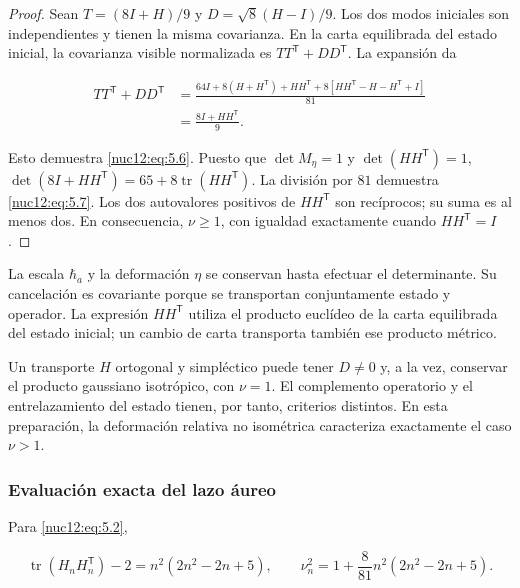 \begin{proof}
Sean \(T=(8I+H)/9\) y \(D=\sqrt8(H-I)/9\). Los dos modos iniciales son independientes y tienen la misma covarianza. En la carta equilibrada del estado inicial, la covarianza visible normalizada es \(TT^{\mathsf T}+DD^{\mathsf T}\). La expansión da



\[
\begin{aligned}
TT^{\mathsf T}+DD^{\mathsf T}
&=\frac{64I+8(H+H^{\mathsf T})+HH^{\mathsf T}
+8[HH^{\mathsf T}-H-H^{\mathsf T}+I]}{81}\\
&=\frac{8I+HH^{\mathsf T}}9.
\end{aligned}
\]



Esto demuestra \eqref{nuc12:eq:5.6}. Puesto que \(\det M_\eta=1\) y \(\det(HH^{\mathsf T})=1\),
\(\det(8I+HH^{\mathsf T})=65+8\operatorname{tr}(HH^{\mathsf T})\).
La división por \(81\) demuestra \eqref{nuc12:eq:5.7}. Los dos autovalores positivos de \(HH^{\mathsf T}\) son recíprocos; su suma es al menos dos. En consecuencia, \(\nu\geq1\), con igualdad exactamente cuando \(HH^{\mathsf T}=I\).
\end{proof}

La escala \(\hbar_a\) y la deformación \(\eta\) se conservan hasta efectuar el determinante. Su cancelación es covariante porque se transportan conjuntamente estado y operador. La expresión \(HH^{\mathsf T}\) utiliza el producto euclídeo de la carta equilibrada del estado inicial; un cambio de carta transporta también ese producto métrico.

Un transporte \(H\) ortogonal y simpléctico puede tener \(D\neq0\) y, a la vez, conservar el producto gaussiano isotrópico, con \(\nu=1\). El complemento operatorio y el entrelazamiento del estado tienen, por tanto, criterios distintos. En esta preparación, la deformación relativa no isométrica caracteriza exactamente el caso \(\nu>1\).

\subsubsection{Evaluación exacta del lazo áureo}

Para \eqref{nuc12:eq:5.2},



\begin{equation}
\operatorname{tr}(H_nH_n^{\mathsf T})-2
=n^2(2n^2-2n+5),\qquad
\nu_n^2=1+\frac8{81}n^2(2n^2-2n+5).
\label{nuc12:eq:5.8}
\end{equation}



